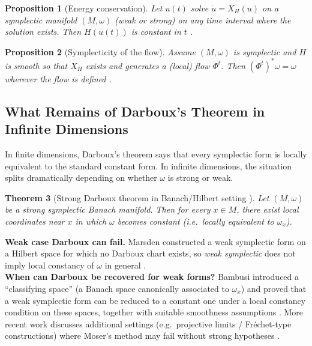 \documentclass{article}
\theoremstyle{plain}
\newtheorem{theorem}{Theorem}[section]
\newtheorem{proposition}[theorem]{Proposition}
\theoremstyle{definition}
\theoremstyle{remark}
\begin{document}
\begin{proposition}[Energy conservation]
Let $u(t)$ solve $\dot u = X_H(u)$ on a symplectic manifold $(M,\omega)$ (weak or strong) on any time interval
where the solution exists. Then $H(u(t))$ is constant in $t$
\cite{chernoffMarsden1974properties}.
\end{proposition}
\begin{proposition}[Symplecticity of the flow]
Assume $(M,\omega)$ is symplectic and $H$ is smooth so that $X_H$ exists and generates a (local) flow $\Phi^t$.
Then $(\Phi^t)^*\omega=\omega$ wherever the flow is defined
\cite{chernoffMarsden1974properties,weinstein1969symplecticBanach}.
\end{proposition}
\subsection{What Remains of Darboux's Theorem in Infinite Dimensions}
\label{subsec:darboux-inf-dim}
In finite dimensions, Darboux's theorem says that every symplectic form is locally equivalent to the standard
constant form. In infinite dimensions, the situation splits dramatically depending on whether $\omega$ is strong
or weak.
\begin{theorem}[Strong Darboux theorem in Banach/Hilbert setting {\cite{weinstein1969symplecticBanach}}]
Let $(M,\omega)$ be a \emph{strong} symplectic Banach manifold. Then for every $x\in M$, there exist local
coordinates near $x$ in which $\omega$ becomes constant (i.e.\ locally equivalent to $\omega_x$).
\end{theorem}
\textbf{Weak case Darboux can fail.}
Marsden constructed a weak symplectic form on a Hilbert space for which no Darboux chart exists,
so \emph{weak symplectic} does not imply local constancy of $\omega$ in general \cite{marsden1972darbouxFails}.\\
\textbf{When can Darboux be recovered for weak forms?}
Bambusi introduced a ``classifying space'' (a Banach space canonically associated to $\omega_x$) and proved that
a weak symplectic form can be reduced to a constant one under a local constancy condition on these spaces,
together with suitable smoothness assumptions \cite{bambusi1999darbouxWeak}.
More recent work discusses additional settings (e.g.\ projective limits / Fr\'echet-type constructions) where Moser's
method may fail without strong hypotheses \cite{pelletier2021projectiveLimitDarboux}.
\end{document}
